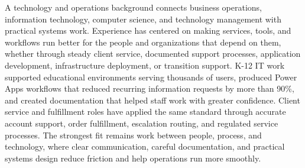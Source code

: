 
%



\justifying\noindent
A technology and operations background connects business operations, information technology, computer science, and technology management with practical systems work. %
Experience has centered on making services, tools, and workflows run better for the people and organizations that depend on them, whether through steady client service, documented support processes, application development, infrastructure deployment, or transition support. %
K-12 IT work supported educational environments serving thousands of users, produced Power Apps workflows that reduced recurring information requests by more than 90\%, and created documentation that helped staff work with greater confidence. %
Client service and fulfillment roles have applied the same standard through accurate account support, order fulfillment, escalation routing, and regulated service processes. %
The strongest fit remains work between people, process, and technology, where clear communication, careful documentation, and practical systems design reduce friction and help operations run more smoothly.


